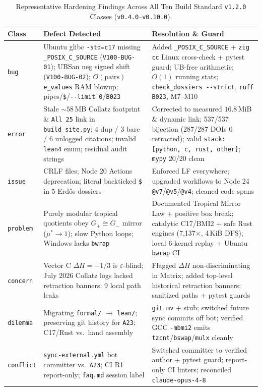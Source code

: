 \documentclass[11pt,reqno]{amsart}
\theoremstyle{plain}
\theoremstyle{definition}
\newcommand{\code}[1]{{\upshape\nolinkurl{#1}}}
\begin{document}
\begin{table}[htbp]
\centering
\caption{Representative Hardening Findings Across All Ten Build Standard \texttt{v1.2.0} Classes (\texttt{v0.4.0}--\texttt{v0.10.0}).}
\label{tab:hardening}
\scriptsize
\begin{tabularx}{\textwidth}{@{}l>{\raggedright\arraybackslash}X>{\raggedright\arraybackslash}X@{}}
\toprule
Class & Defect Detected & Resolution \& Guard \\
\midrule
\code{bug} & Ubuntu glibc \texttt{-std=c17} missing \code{_POSIX_C_SOURCE} (\code{V100-BUG-01}); UBSan neg signed shift (\code{V100-BUG-02}); $O(\text{pairs})$ \code{e_values} RAM blowup; pipes/\code{\$}/\code{--limit 0}/\code{B023} & Added \code{_POSIX_C_SOURCE} + \code{zig cc} Linux cross-check + pytest guard; UB-free arithmetic; $O(1)$ running stats; \code{check_dossiers --strict}, \code{ruff B023}, M7--M10 \\
\code{error} & Stale $\sim 58$\,MB Collatz footprint \& \code{All 25} link in \code{build_site.py}; 4 dup / 3 bare / 6 unlogged citations; invalid \code{lean4} enum; residual audit strings & Corrected to measured $16.8$\,MiB \& dynamic link; 537/537 bijection (287/287 DOIs 0 retracted); valid \code{stack: [python, c, rust, other]}; \code{mypy} 20/20 clean \\
\code{issue} & 89 CRLF files; Node 20 Actions deprecation; literal backticked \code{\$} in 5 Erd\H{o}s dossiers & Enforced LF everywhere; upgraded workflows to Node 24 \code{@v7}/\code{@v5}/\code{@v4}; cleaned code spans \\
\code{problem} & Purely modular tropical quotients obey $G_+ \cong G_-$ mirror ($\mu^* \to 1$); slow Python loops; Windows lacks \code{bwrap} & Documented Tropical Mirror Law + positive box break; catalytic C17/BMI2 + safe Rust engines (7,137$\times$, 4\,KiB DFS); local 6-kernel replay + Ubuntu \code{bwrap} CI \\
\code{concern} & Vector C $\Delta H = -1/3$ is $\varepsilon$-blind; July 2026 Collatz logs lacked retraction banners; 9 local path leaks & Flagged $\Delta H$ non-discriminating in Matrix; added top-level historical retraction banners; sanitized paths + pytest guards \\
\code{dilemma} & Migrating \code{formal/} $\to$ \code{lean/}; preserving git history for \code{A23}; C17/Rust vs.\ hand assembly & \code{git mv} + stub; switched future sync commits off bot; verified GCC \code{-mbmi2} emits \code{tzcnt}/\code{bswap}/\code{mulx} cleanly \\
\code{conflict} & \code{sync-external.yml} bot committer vs.\ \code{A23}; CI R1 report-only; \code{faq.md} session label & Switched committer to verified author + pytest guard; report-only CI linters; reconciled \code{claude-opus-4-8} \\

\end{tabularx}
\end{table}
\end{document}
